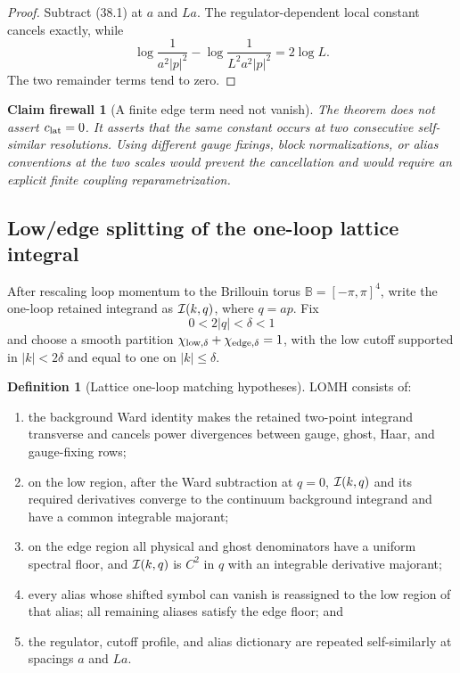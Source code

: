 \documentclass[11pt,oneside]{book}
\newtheorem{firewall}[theorem]{Claim firewall}
\theoremstyle{definition}
\newtheorem{definition}[theorem]{Definition}
\theoremstyle{remark}
\begin{document}
\begin{proof}
Subtract (38.1) at \(a\) and \(La\).  The regulator-dependent local
constant cancels exactly, while
\[
 \log\frac1{a^2|p|^2}
 -
 \log\frac1{L^2a^2|p|^2}
 =2\log L.
\]
The two remainder terms tend to zero.
\end{proof}

\begin{firewall}[A finite edge term need not vanish]
\label{fire:e8v38-edge-finite}
The theorem does not assert \(c_{\rm lat}=0\).  It asserts that the
same constant occurs at two consecutive self-similar resolutions.
Using different gauge fixings, block normalizations, or alias
conventions at the two scales would prevent the cancellation and
would require an explicit finite coupling reparametrization.
\end{firewall}

\subsection{Low/edge splitting of the one-loop lattice integral}

After rescaling loop momentum to the Brillouin torus
\({\mathbb B}=[-\pi,\pi]^4\), write the one-loop retained integrand
as \({\cal I}(k,q)\), where \(q=ap\).  Fix
\[
                         0<2|q|<\delta<1                         \tag{38.5}
\]
and choose a smooth partition
\(\chi_{\rm low,\delta}+\chi_{\rm edge,\delta}=1\), with the low
cutoff supported in \(|k|<2\delta\) and equal to one on
\(|k|\leq\delta\).

\begin{definition}[Lattice one-loop matching hypotheses]
\label{def:e8v38-LOMH}
LOMH consists of:
\begin{enumerate}
\item the background Ward identity makes the retained two-point
      integrand transverse and cancels power divergences between
      gauge, ghost, Haar, and gauge-fixing rows;
\item on the low region, after the Ward subtraction at \(q=0\),
      \({\cal I}(k,q)\) and its required derivatives converge to the
      continuum background integrand and have a common integrable
      majorant;
\item on the edge region all physical and ghost denominators have a
      uniform spectral floor, and \({\cal I}(k,q)\) is \(C^2\) in
      \(q\) with an integrable derivative majorant;
\item every alias whose shifted symbol can vanish is reassigned to
      the low region of that alias; all remaining aliases satisfy
      the edge floor; and
\item the regulator, cutoff profile, and alias dictionary are
      repeated self-similarly at spacings \(a\) and \(La\).
\end{enumerate}
\end{definition}
\end{document}
